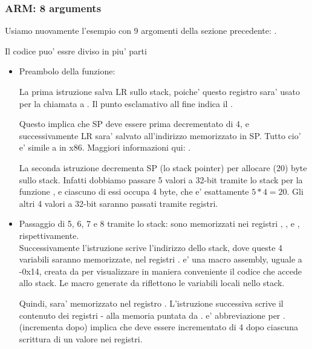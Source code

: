 \subsubsection{ARM: 8 arguments}

Usiamo nuovamente l'esempio con 9 argomenti della sezione precedente: .



\myparagraph{\OptimizingKeilVI: \ARMMode}



Il codice puo' essre diviso in piu' parti

\begin{itemize}
\item Preambolo della funzione:

La prima istruzione  salva \ac{LR} sullo stack, poiche' questo registro sara' usato per la chiamata a \printf.
Il punto esclamativo all fine indica il .

Questo implica che \ac{SP} deve essere prima decrementato di 4, e successivamente \ac{LR} sara' salvato all'indirizzo memorizzato in \ac{SP}.
Tutto cio' e' simile a \PUSH in x86.
Maggiori informazioni qui: .

La seconda istruzione  decrementa \ac{SP} (lo \gls{stack pointer}) per allocare  (20) byte sullo stack.
Infatti dobbiamo passare 5 valori a 32-bit tramite lo stack per la funzione \printf, e ciascuno di essi occupa 4 byte, che e' esattamente $5*4=20$.
Gli altri 4 valori a 32-bit saranno passati tramite registri.

\item Passaggio di 5, 6, 7 e 8 tramite lo stack: sono memorizzati nei registri , ,  e , rispettivamente.\\
Successivamente l'istruzione  scrive l'indirizzo dello stack, dove queste 4 variabili saranno memorizzate,
nel registri .
 e' una macro assembly, uguale a -0x14, creata da \IDA per visualizzare in maniera conveniente il codice che accede allo stack.
Le macro  generate da \IDA riflettono le variabili locali nello stack.

Quindi,  sara' memorizzato nel registro .
L'istruzione successiva  scrive il contenuto dei registri - alla memoria puntata da .
 e' abbreviazione per . 
 (incrementa dopo) implica che  deve essere incrementato di 4 dopo ciascuna scrittura di un valore nei registri.


\end{itemize}
